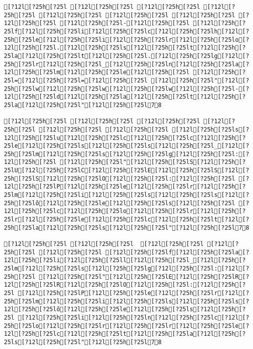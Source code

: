 \documentclass{scrartcl}
\begin{document}
\begin{Verbatim}
[?12l[?25h[?25l [?12l[?25h[?25l [?12l[?25h[?25l [?12l[?25h[?25l [?12l[?25h[?25l [?12l[?25h[?25l [?12l[?25h[?25l [?12l[?25h[?25l [?12l[?25h[?25l-[?12l[?25h[?25l [?12l[?25h[?25lf[?12l[?25h[?25li[?12l[?25h[?25lc[?12l[?25h[?25lh[?12l[?25h[?25le[?12l[?25h[?25li[?12l[?25h[?25lr[?12l[?25h[?25lo[?12l[?25h[?25l.[?12l[?25h[?25ls[?12l[?25h[?25lt[?12l[?25h[?25la[?12l[?25h[?25lt[?12l[?25h[?25l.[?12l[?25h[?25lg[?12l[?25h[?25lr[?12l[?25h[?25l_[?12l[?25h[?25ln[?12l[?25h[?25la[?12l[?25h[?25lm[?12l[?25h[?25le[?12l[?25h[?25l [?12l[?25h[?25l=[?12l[?25h[?25l=[?12l[?25h[?25l [?12l[?25h[?25l"[?12l[?25h[?25lw[?12l[?25h[?25lw[?12l[?25h[?25lw[?12l[?25h[?25l-[?12l[?25h[?25ld[?12l[?25h[?25la[?12l[?25h[?25lt[?12l[?25h[?25la[?12l[?25h[?25l"[?12l[?25h[?25l78

[?12l[?25h[?25l [?12l[?25h[?25l [?12l[?25h[?25l [?12l[?25h[?25l [?12l[?25h[?25l [?12l[?25h[?25l [?12l[?25h[?25ls[?12l[?25h[?25lu[?12l[?25h[?25lc[?12l[?25h[?25lc[?12l[?25h[?25le[?12l[?25h[?25ls[?12l[?25h[?25ls[?12l[?25h[?25l_[?12l[?25h[?25lm[?12l[?25h[?25ls[?12l[?25h[?25lg[?12l[?25h[?25l:[?12l[?25h[?25l [?12l[?25h[?25l"[?12l[?25h[?25lS[?12l[?25h[?25lU[?12l[?25h[?25lC[?12l[?25h[?25lE[?12l[?25h[?25lS[?12l[?25h[?25lS[?12l[?25h[?25lO[?12l[?25h[?25l:[?12l[?25h[?25l [?12l[?25h[?25lP[?12l[?25h[?25le[?12l[?25h[?25lr[?12l[?25h[?25lm[?12l[?25h[?25li[?12l[?25h[?25ls[?12l[?25h[?25ls[?12l[?25h[?25lõ[?12l[?25h[?25le[?12l[?25h[?25ls[?12l[?25h[?25l [?12l[?25h[?25lc[?12l[?25h[?25lo[?12l[?25h[?25lr[?12l[?25h[?25lr[?12l[?25h[?25le[?12l[?25h[?25lc[?12l[?25h[?25lt[?12l[?25h[?25la[?12l[?25h[?25ls[?12l[?25h[?25l"[?12l[?25h[?25l78

[?12l[?25h[?25l [?12l[?25h[?25l  [?12l[?25h[?25l [?12l[?25h[?25l [?12l[?25h[?25l [?12l[?25h[?25lf[?12l[?25h[?25la[?12l[?25h[?25li[?12l[?25h[?25ll[?12l[?25h[?25l_[?12l[?25h[?25lm[?12l[?25h[?25ls[?12l[?25h[?25lg[?12l[?25h[?25l:[?12l[?25h[?25l [?12l[?25h[?25l"[?12l[?25h[?25lE[?12l[?25h[?25lR[?12l[?25h[?25lR[?12l[?25h[?25lO[?12l[?25h[?25l:[?12l[?25h[?25l [?12l[?25h[?25lP[?12l[?25h[?25le[?12l[?25h[?25lr[?12l[?25h[?25lm[?12l[?25h[?25li[?12l[?25h[?25ls[?12l[?25h[?25ls[?12l[?25h[?25lõ[?12l[?25h[?25le[?12l[?25h[?25ls[?12l[?25h[?25l [?12l[?25h[?25li[?12l[?25h[?25ln[?12l[?25h[?25lc[?12l[?25h[?25lo[?12l[?25h[?25lr[?12l[?25h[?25lr[?12l[?25h[?25le[?12l[?25h[?25lc[?12l[?25h[?25lt[?12l[?25h[?25la[?12l[?25h[?25ls[?12l[?25h[?25l"[?12l[?25h[?25l78


\end{Verbatim}
\end{document}
